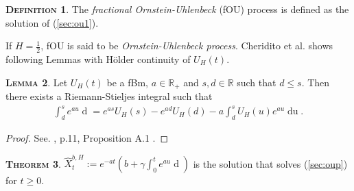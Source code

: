 \documentclass[a4paper, twoside, 11pt]{article}
\theoremstyle{definition}
\newtheorem{definition}{\scshape Definition}[section]
\newtheorem{theorem}[definition]{\scshape Theorem}
\newtheorem{lemma}[definition]{\scshape Lemma}
\newcommand{\brkt}[1]{\left({#1} \right)}
\begin{document}
  \begin{definition}
	The \emph{fractional Ornstein-Uhlenbeck} (fOU) process is defined as the solution of (\ref{sec:ou1}).
  \end{definition}

  If $H=\frac{1}{2}$, fOU is said to be \emph{Ornstein-Uhlenbeck process}. Cheridito et al.\cite{chriel} shows following Lemmas with H\"older continuity of $U_H(t)$.
  \begin{lemma}
	Let $U_H(t)$ be a fBm, $a \in \mathbb{R}_+$ and $s, d\in \mathbb{R}$ such that $d\le s$. Then there exists a Riemann-Stieljes integral such that 
	\begin{eqnarray}
	  \int_d^s e^{au} \mathop{dU_H(u)} = e^{as} U_H(s) - e^{ad} U_H(d) - a\int_d^s U_H(u) e^{au}\mathop{du}.
	  \label{sec:rie}
	\end{eqnarray}
  \end{lemma}

  \begin{proof}
	See. \cite{chriel}, p.11, Proposition A.1 .
  \end{proof}



  \begin{theorem}
	$\hat{X}^{b,H}_t := e^{-at} \brkt{b + \gamma\int_0^t e^{au}\mathop{dU_H(u)}}$ is the solution that solves (\ref{sec:oup}) for $t\ge 0$.
	\label{sec:sol}
  \end{theorem}
\end{document}
